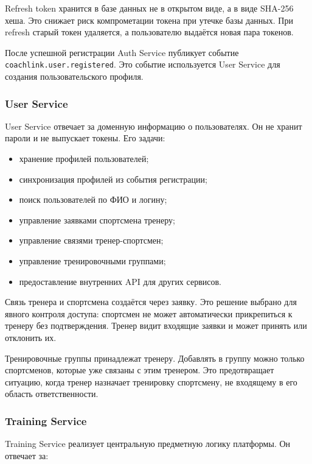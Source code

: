 Refresh token хранится в базе данных не в открытом виде, а в виде SHA-256 хеша. Это снижает риск компрометации токена при утечке базы данных. При refresh старый токен удаляется, а пользователю выдаётся новая пара токенов.

После успешной регистрации Auth Service публикует событие \passthrough{\lstinline!coachlink.user.registered!}. Это событие используется User Service для создания пользовательского профиля.

\subsubsection{User Service}

User Service отвечает за доменную информацию о пользователях. Он не хранит пароли и не выпускает токены. Его задачи:

\begin{itemize}
\tightlist
\item
  хранение профилей пользователей;
\item
  синхронизация профилей из события регистрации;
\item
  поиск пользователей по ФИО и логину;
\item
  управление заявками спортсмена тренеру;
\item
  управление связями тренер-спортсмен;
\item
  управление тренировочными группами;
\item
  предоставление внутренних API для других сервисов.
\end{itemize}

Связь тренера и спортсмена создаётся через заявку. Это решение выбрано для явного контроля доступа: спортсмен не может автоматически прикрепиться к тренеру без подтверждения. Тренер видит входящие заявки и может принять или отклонить их.

Тренировочные группы принадлежат тренеру. Добавлять в группу можно только спортсменов, которые уже связаны с этим тренером. Это предотвращает ситуацию, когда тренер назначает тренировку спортсмену, не входящему в его область ответственности.

\subsubsection{Training Service}

Training Service реализует центральную предметную логику платформы. Он отвечает за:

